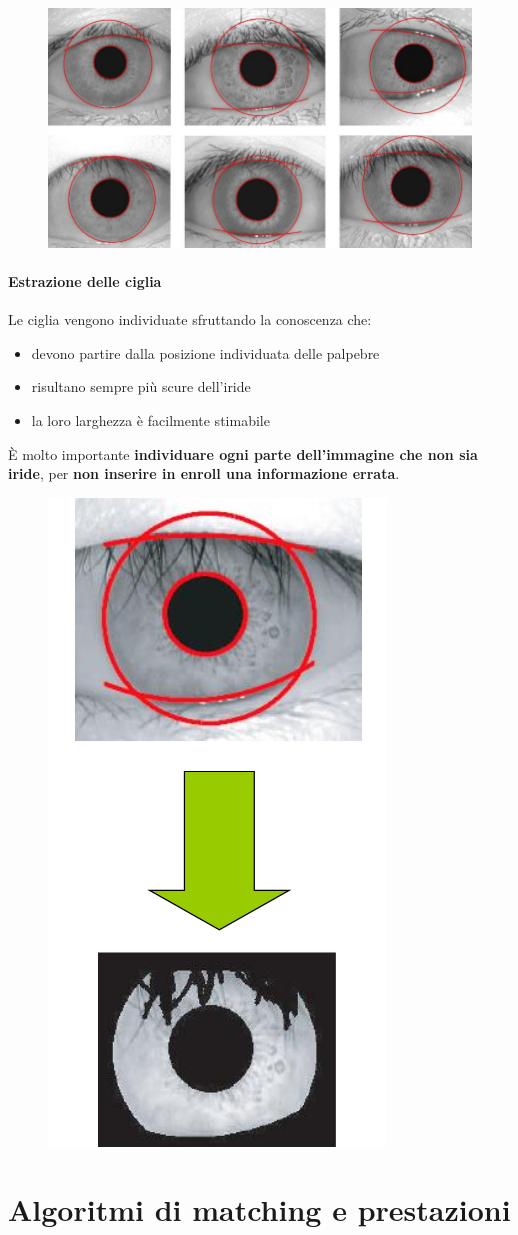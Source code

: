 \documentclass{report}
\begin{document}
\begin{figure}[ht]
    \centering
    \includegraphics[width=0.5\linewidth]{images/estrazione-palpebre.png}
\end{figure}



\subsubsection{Estrazione delle ciglia}
Le ciglia vengono individuate sfruttando la conoscenza che:
\begin{itemize}
    \item devono partire dalla posizione individuata delle palpebre 
    \item risultano sempre più scure dell'iride 
    \item la loro larghezza è facilmente stimabile
\end{itemize}

\noindent È molto importante \textbf{individuare ogni parte dell'immagine che 
non sia iride}, per \textbf{non inserire in enroll una informazione errata}.

\begin{figure}[ht]
    \centering
    \includegraphics[width=0.3\linewidth]{images/estrazione-ciglia.png}
\end{figure}

\chapter{Algoritmi di matching e prestazioni}
\end{document}
